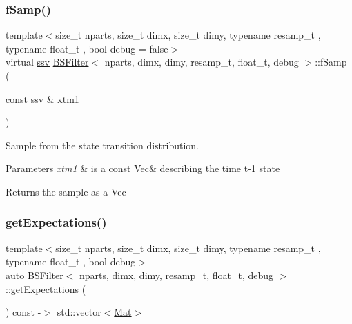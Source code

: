 \subsubsection{\texorpdfstring{f\+Samp()}{fSamp()}}
{\footnotesize\ttfamily template$<$size\+\_\+t nparts, size\+\_\+t dimx, size\+\_\+t dimy, typename resamp\+\_\+t , typename float\+\_\+t , bool debug = false$>$ \\
virtual \hyperlink{classBSFilter_ad2341b982bcdabc798d7ed0f327d28f7}{ssv} \hyperlink{classBSFilter}{B\+S\+Filter}$<$ nparts, dimx, dimy, resamp\+\_\+t, float\+\_\+t, debug $>$\+::f\+Samp (\begin{DoxyParamCaption}\item[{const \hyperlink{classBSFilter_ad2341b982bcdabc798d7ed0f327d28f7}{ssv} \&}]{xtm1 }\end{DoxyParamCaption})\hspace{0.3cm}{\ttfamily [pure virtual]}}



Sample from the state transition distribution. 


\begin{DoxyParams}{Parameters}
{\em xtm1} & is a const Vec\& describing the time t-\/1 state \\
\hline
\end{DoxyParams}
\begin{DoxyReturn}{Returns}
the sample as a Vec 
\end{DoxyReturn}
\mbox{\label{classBSFilter_a837a9dc83c07195fb96b4228dc8e41fe}} 
\subsubsection{\texorpdfstring{get\+Expectations()}{getExpectations()}}
{\footnotesize\ttfamily template$<$size\+\_\+t nparts, size\+\_\+t dimx, size\+\_\+t dimy, typename resamp\+\_\+t , typename float\+\_\+t , bool debug$>$ \\
auto \hyperlink{classBSFilter}{B\+S\+Filter}$<$ nparts, dimx, dimy, resamp\+\_\+t, float\+\_\+t, debug $>$\+::get\+Expectations (\begin{DoxyParamCaption}{ }\end{DoxyParamCaption}) const -\/$>$ std\+::vector$<$\hyperlink{classBSFilter_a190a71c131060b131c11ebe2c3fefbeb}{Mat}$>$}



